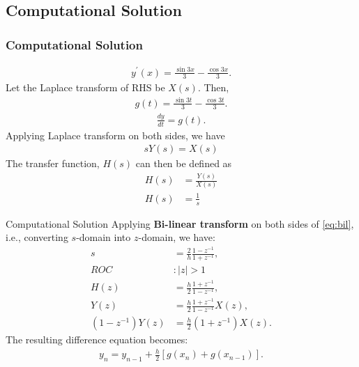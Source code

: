 \documentclass{beamer}
\numberwithin{equation}{section}
\begin{document}
\subsection{Computational Solution}
\begin{frame}
\frametitle{Computational Solution}
\begin{align}
y^\prime(x) = \frac{\sin3x}{3} - \frac{\cos3x}{3}.
\end{align}
Let the Laplace transform of RHS be \(X(s)\). Then,
\begin{align}
g(t) = \frac{\sin3t}{3} - \frac{\cos3t}{3}.
\end{align}
\begin{align}
\frac{dy}{dt} = g(t).
\end{align}
Applying Laplace transform on both sides, we have
\begin{align}
s Y(s) = X(s)
\end{align}
The transfer function, $H(s)$ can then be defined as
\begin{align}
	H(s) &= \frac{Y(s)}{X(s)} \\
	H(s) &= \frac{1}{s} \label{eq:bil}
\end{align}
\end{frame}
\begin{frame}{Computational Solution}
Applying \textbf{Bi-linear transform} on both sides of \eqref{eq:bil}, i.e., converting \(s\)-domain into \(z\)-domain, we have:
\begin{align}
    s &= \frac{2}{h} \frac{1 - z^{-1}}{1 + z^{-1}}, \\
    ROC&: |z|>1\\
    H(z) &= \frac{h}{2} \frac{1 + z^{-1}}{1 - z^{-1}}, \\
    Y(z) &= \frac{h}{2} \frac{1 + z^{-1}}{1 - z^{-1}} X(z), \\
    (1 - z^{-1}) Y(z) &= \frac{h}{2} \left(1 + z^{-1}\right) X(z). \label{eq:iz}
\end{align}
The resulting difference equation becomes:
\begin{align}
    y_{n} = y_{n-1} + \frac{h}{2} \left[ g(x_n) + g(x_{n-1}) \right].
\end{align}
\end{frame}
\end{document}
